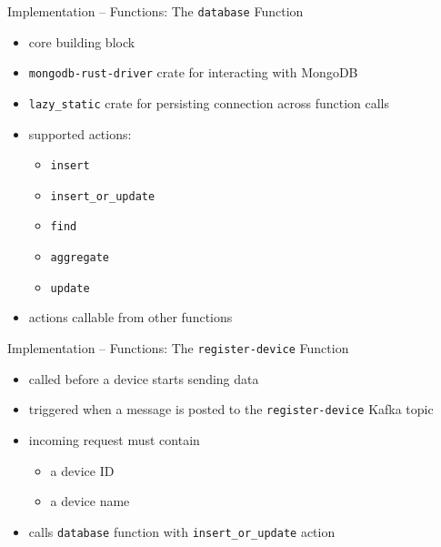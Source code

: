 \begin{frame}{Implementation -- Functions: The \texttt{database} Function}
  \begin{itemize}
    \item core building block
    \item \texttt{mongodb-rust-driver} crate for interacting with MongoDB
    \item \texttt{lazy\_static} crate for persisting connection across function calls
    \item supported actions:
      \begin{itemize}
        \item \texttt{insert}
        \item \texttt{insert\_or\_update}
        \item \texttt{find}
        \item \texttt{aggregate}
        \item \texttt{update}
      \end{itemize}
    \item actions callable from other functions
  \end{itemize}
\end{frame}

\begin{frame}{Implementation -- Functions: The \texttt{register-device} Function}
  \begin{itemize}
    \item called before a device starts sending data
    \item triggered when a message is posted to the \texttt{register-device} Kafka topic
    \item incoming request must contain
      \begin{itemize}
        \item a device ID
        \item a device name
      \end{itemize}
    \item calls \texttt{database} function with \texttt{insert\_or\_update} action
  \end{itemize}
\end{frame}


